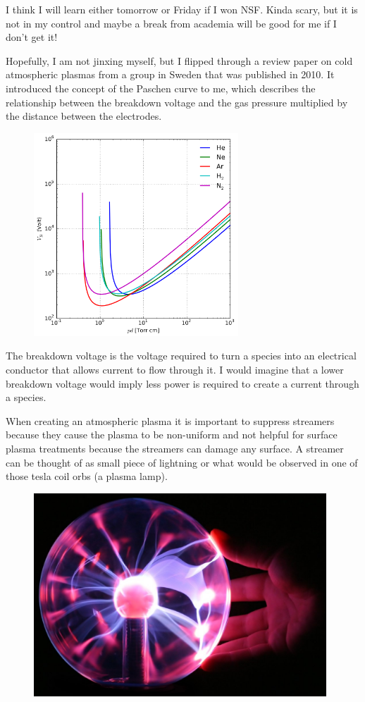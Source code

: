 \documentclass[12pt]{report}
\begin{document}
\par
I think I will learn either tomorrow or Friday if I won NSF. Kinda scary, but it is not in my control and maybe a break from academia will be good for me if I don't get it!

\par
Hopefully, I am not jinxing myself, but I flipped through a review paper on cold atmospheric plasmas from a group in Sweden that was published in 2010. It introduced the concept of the Paschen curve to me, which describes the relationship between the breakdown voltage and the gas pressure multiplied by the distance between the electrodes. 

\begin{figure}[H]
\centering
\includegraphics[height=3in]{images/paschencurve.png}
\end{figure}

The breakdown voltage is the voltage required to turn a species into an electrical conductor that allows current to flow through it. I would imagine that a lower breakdown voltage would imply less power is required to create a current through a species.  

\par
When creating an atmospheric plasma it is important to suppress streamers because they cause the plasma to be non-uniform and not helpful for surface plasma treatments because the streamers can damage any surface. A streamer can be thought of as small piece of lightning or what would be observed in one of those tesla coil orbs (a plasma lamp). 

\begin{figure}[H]
\centering
\includegraphics[height=3in]{images/streamerplasma.jpeg}
\end{figure}
\end{document}
